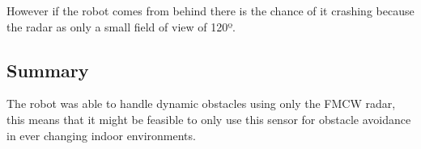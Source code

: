 However if the robot comes from behind there is the chance of it crashing because the radar as only a small field of view of 120º.
\subsection{Summary}
The robot was able to handle dynamic obstacles using only the \ac{FMCW} \ac{radar}, this means that it might be feasible to only use this sensor for obstacle avoidance in ever changing indoor environments. 